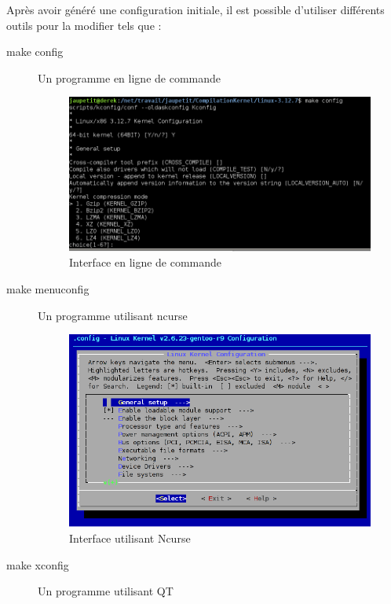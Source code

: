 \documentclass[16pts]{report}
\begin{document}
Après avoir généré une configuration initiale, il est possible d’utiliser
différents outils pour la modifier tels que :

\begin{description}
    \item[make config]      	Un programme en ligne de commande \\
        \begin{figure}[H]
            \includegraphics[scale=0.7]{illustrations/configLine.png}
            \centering
            \caption{Interface en ligne de commande}
            \label{fig:MakeConfig}
        \end{figure}
        \pagebreak
    \item[make menuconfig]      Un programme utilisant ncurse \\

        \begin{figure}[H]
            \includegraphics[scale=0.7]{illustrations/menuconfig.png}
            \centering
            \caption{Interface utilisant Ncurse}
            \label{fig:MakeMenuConfig}
        \end{figure}
    \item[make xconfig]     	Un programme utilisant QT \\


\end{description}
\end{document}
